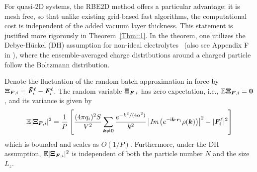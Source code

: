 For quasi-2D systems, the RBE2D method offers a particular advantage: it is mesh free, so that unlike existing grid-based fast algorithms, the computational cost is independent   {of the} added vacuum layer thickness. This statement is justified more rigorously in Theorem~\ref{Thm::1}. 
 {In the theorem, one utilizes the Debye-H\"uckel (DH) assumption for non-ideal electrolytes~\cite{levin2002electrostatic} (also see Appendix F in \cite{gan2024fast}), where the ensemble-averaged charge distributions around a charged particle follow the Boltzmann distribution.
}

\begin{thm}\label{Thm::1} 
    Denote the fluctuation of the random batch approximation in force by $\boldsymbol{\Xi}_{\boldsymbol{F},i}=\boldsymbol{\tilde{F}}_i^{\ell}-\boldsymbol{F}_i^{\ell}$. The random variable $\boldsymbol{\Xi}_{\boldsymbol{F},i}$ has zero expectation, i.e., $\mathbb{E}\boldsymbol{\Xi}_{\boldsymbol{F},i}=\boldsymbol{0}$, and its variance is given by
    \begin{equation}\label{eq::30}
        \mathbb{E}|\boldsymbol{\Xi}_{\boldsymbol{F},i}|^2=\frac{1}{P}\left[\frac{(4\pi q_i)^2S}{V^2}\sum_{\bm{k}\neq \bm{0}}\frac{e^{-k^2/(4\alpha^2)}}{k^2}\left|\emph{Im}\left(e^{-\mathsf i \boldsymbol{k} \cdot \boldsymbol{r}_i}\rho(\boldsymbol{k})\right)\right|^2-|\boldsymbol{F}_{i}^{\ell}|^2\right]
    \end{equation}
    which is bounded and scales as $O(1/P)$. Furthermore, under the DH assumption, $\mathbb{E}|\boldsymbol{\Xi}_{\boldsymbol{F},i}|^2$ is independent of both the particle number $N$ and the size $L_z$.
\end{thm}

